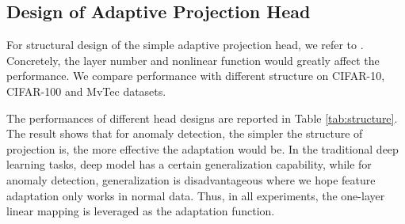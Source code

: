 \documentclass{article}
\begin{document}
\subsection{Design of Adaptive Projection Head}

For structural design of the simple adaptive projection head, we refer to \cite{chen2020simple}. Concretely, the layer number and nonlinear function would greatly affect the performance. We compare performance with different structure on CIFAR-10, CIFAR-100 and MvTec datasets.

The performances of different head designs are reported in Table \ref{tab:structure}. The result shows that for anomaly detection, the simpler the structure of projection is, the more effective the adaptation would be. In the traditional deep learning tasks, deep model has a certain generalization capability, while for anomaly detection, generalization is disadvantageous where we hope feature adaptation only works in normal data. Thus, in all experiments, the one-layer linear mapping is leveraged as the adaptation function.




\begin{table}[t]
\caption{Anomaly detection performance with different CAP structure design.}
\label{tab:structure}
\end{table}
\end{document}
